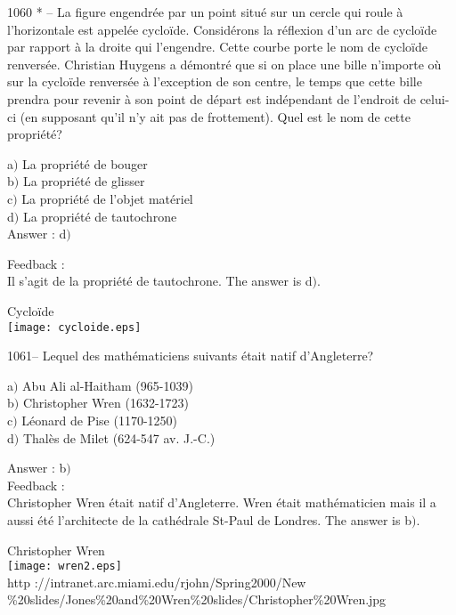 ﻿\documentclass[letterpaper, 12pt]{article}
\begin{document}
1060 * -- La figure engendr\'ee par un point situ\'e sur un cercle
qui roule \`a l'horizontale est appel\'ee cyclo\"ide. Consid\'erons
la r\'eflexion d'un arc de cyclo\"ide par rapport \`a la droite qui
l'engendre. Cette courbe porte le nom de cyclo\"ide renvers\'ee.
Christian Huygens a d\'emontr\'e que si on place une bille n'importe
o\`u sur la cyclo\"ide renvers\'ee \`a l'exception de son centre, le
temps que cette bille prendra pour revenir \`a son point de d\'epart
est ind\'ependant de l'endroit de celui-ci (en supposant qu'il n'y
ait pas de frottement). Quel est le nom de cette propri\'et\'e?

a$)$ La propri\'et\'e de bouger  \\
b$)$ La propri\'et\'e de glisser  \\
c$)$ La propri\'et\'e de l'objet mat\'eriel \\
d$)$ La propri\'et\'e de tautochrone \\

Answer : d$)$

Feedback : \\
Il s'agit de la propri\'et\'e de tautochrone.
The answer is d$)$.\\

        \begin{center}

Cyclo\"ide        \\
    \texttt{[image: cycloide.eps]}\\
    \end{center}

1061-- Lequel des math\'ematiciens suivants \'etait natif
d'Angleterre?

a$)$ Abu Ali al-Haitham (965-1039) \\
b$)$ Christopher Wren (1632-1723) \\
c$)$ L\'eonard de Pise (1170-1250) \\
d$)$ Thal\`es de Milet (624-547 av. J.-C.)

Answer : b$)$\\

Feedback : \\
Christopher Wren \'etait natif d'Angleterre. Wren \'etait
math\'ematicien mais il a aussi \'et\'e l'architecte de la
cath\'edrale St-Paul de Londres.
The answer is b$)$.\\

        \begin{center}
        Christopher Wren\\
    \texttt{[image: wren2.eps]}\\
        {\footnotesize http ://intranet.arc.miami.edu/rjohn/Spring2000/New\\
        \%20slides/Jones\%20and\%20Wren\%20slides/Christopher\%20Wren.jpg}
    \end{center}
\end{document}
